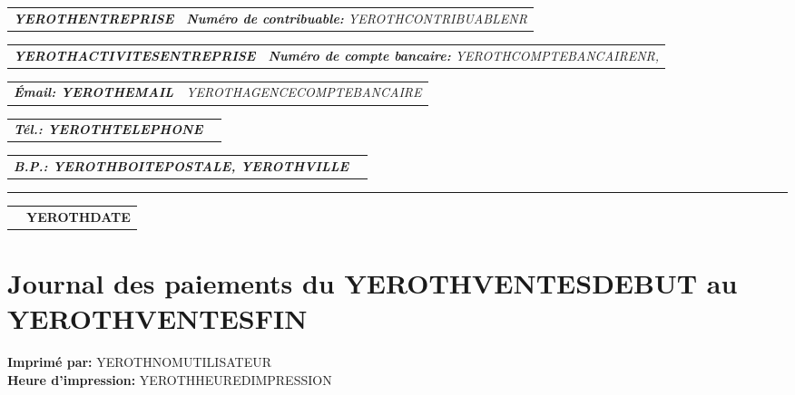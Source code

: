 \documentclass[16pt,YEROTHPAPERSPEC]{article} %
\makeatletter
\newcommand{\headerrow}[2]
{\begin{tabular*}{\linewidth}{l@{\extracolsep{\fill}}r}
	#1 &
	#2 \\
\end{tabular*}}
\newcommand{\emphbold}[1]{\textbf{\emph{#1}}\xspace}
\makeatother
\begin{document}
\bigskip

\headerrow
	{\emphbold{YEROTHENTREPRISE}}
	{\emph{\textbf{Num\'ero de contribuable:} YEROTHCONTRIBUABLENR}}
\headerrow
	{\emphbold{YEROTHACTIVITESENTREPRISE}}
	{\emph{\textbf{Num\'ero de compte bancaire:} YEROTHCOMPTEBANCAIRENR,}}
\headerrow
	{\emphbold{\'Email: YEROTHEMAIL}}
	{\emph{YEROTHAGENCECOMPTEBANCAIRE}}
\headerrow
	{\emphbold{T\'el.: YEROTHTELEPHONE}}
	{}
\headerrow
	{\emphbold{B.P.: YEROTHBOITEPOSTALE, YEROTHVILLE}}
	{}
	
\hrule

\headerrow
	{}
	{\textbf{YEROTHDATE}}

\section*{Journal des paiements du YEROTHVENTESDEBUT au YEROTHVENTESFIN}

\textbf{Imprim\'e par:} YEROTHNOMUTILISATEUR\\
\textbf{Heure d'impression:} YEROTHHEUREDIMPRESSION

\vspace{0.3cm}
\end{document}
